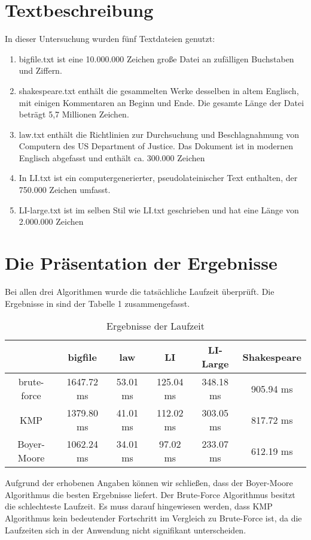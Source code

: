 \documentclass[14pt]{article}
\begin{document}
\section{Textbeschreibung}
In dieser Untersuchung wurden fünf Textdateien genutzt:\\

\begin{enumerate}
\item bigfile.txt ist eine 10.000.000 Zeichen große Datei an zufälligen Buchstaben und Ziffern.

\item shakespeare.txt enthält die gesammelten Werke desselben in altem Englisch, mit einigen Kommentaren an
 Beginn und Ende. Die gesamte Länge der Datei beträgt 5,7 Millionen Zeichen.
\item law.txt enthält die Richtlinien zur Durchsuchung und Beschlagnahmung von Computern des US Department of Justice. Das Dokument ist in modernen Englisch abgefasst und enthält ca. 300.000 Zeichen
\item In LI.txt ist ein computergenerierter,
 pseudolateinischer Text enthalten, der 750.000 Zeichen umfasst.
\item LI-large.txt ist im selben Stil wie LI.txt geschrieben und hat eine Länge von 2.000.000 Zeichen
\end{enumerate}

\section{Die Präsentation der Ergebnisse}
Bei allen drei Algorithmen wurde die tatsächliche Laufzeit überprüft. Die Ergebnisse in sind der Tabelle 1 zusammengefasst. 


\begin{table}[h]
\begin{tabular}{ |c|c|c|c|c|c| }
\hline
  & bigfile & law & LI & LI-Large & Shakespeare \\
\hline 
 brute-force & 1647.72 ms & 53.01 ms & 125.04 ms& 348.18 ms & 905.94 ms\\ 
\hline
 KMP & 1379.80 ms & 41.01 ms & 112.02 ms & 303.05 ms & 817.72 ms\\ 
\hline
 Boyer-Moore & 1062.24 ms & 34.01 ms & 97.02 ms & 233.07 ms & 612.19 ms\\ 
\hline
\end{tabular}
\label{Ergebnisse}
\caption{ Ergebnisse der Laufzeit}
\end{table}


Aufgrund der erhobenen Angaben können wir schließen, dass der Boyer-Moore Algorithmus die besten Ergebnisse liefert. Der Brute-Force Algorithmus besitzt die schlechteste Laufzeit. Es muss darauf hingewiesen werden, dass KMP Algorithmus kein bedeutender Fortschritt im Vergleich zu Brute-Force ist, da die Laufzeiten sich in der Anwendung nicht signifikant unterscheiden.
\end{document}

